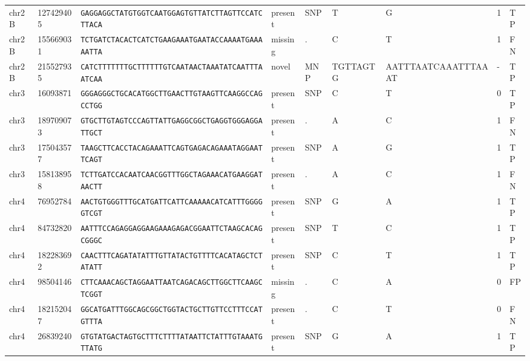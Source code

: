 \begin{landscape}
\begin{table}[]
\begin{tabular}{@{}lllllllll@{}}
chr2B & 127429405 & \texttt{GAGGAGGCTATGTGGTCAATGGAGTGTTATCTTAGTTCCATCTTACA} & present            & SNP       & T        & G                   & 1         & TP     \\
chr2B & 155669031 & \texttt{TCTGATCTACACTCATCTGAAGAAATGAATACCAAAATGAAAAATTA} & missing            & .         & C        & T                   & 1         & FN     \\
chr2B & 215527935 & \texttt{CATCTTTTTTTGCTTTTTTGTCAATAACTAAATATCAATTTAATCAA} & novel              & MNP       & TGTTAGTG & AATTTAATCAAATTTAAAT & -         & TP     \\
chr3  & 16093871  & \texttt{GGGAGGGCTGCACATGGCTTGAACTTGTAAGTTCAAGGCCAGCCTGG} & present            & SNP       & C        & T                   & 0         & TP     \\
chr3  & 189709073 & \texttt{GTGCTTGTAGTCCCAGTTATTGAGGCGGCTGAGGTGGGAGGATTGCT} & present            & .         & A        & C                   & 1         & FN     \\
chr3  & 175043577 & \texttt{TAAGCTTCACCTACAGAAATTCAGTGAGACAGAAATAGGAATTCAGT} & present            & SNP       & A        & G                   & 1         & TP     \\
chr3  & 158138958 & \texttt{TCTTGATCCACAATCAACGGTTTGGCTAGAAACATGAAGGATAACTT} & present            & .         & A        & C                   & 1         & FN     \\
chr4  & 76952784  & \texttt{AACTGTGGGTTTGCATGATTCATTCAAAAACATCATTTGGGGGTCGT} & present            & SNP       & G        & A                   & 1         & TP     \\
chr4  & 84732820  & \texttt{AATTTCCAGAGGAGGAAGAAAGAGACGGAATTCTAAGCACAGCGGGC} & present            & SNP       & T        & C                   & 1         & TP     \\
chr4  & 182283692 & \texttt{CAACTTTCAGATATATTTGTTATACTGTTTTCACATAGCTCTATATT} & present            & SNP       & C        & T                   & 1         & TP     \\
chr4  & 98504146  & \texttt{CTTCAAACAGCTAGGAATTAATCAGACAGCTTGGCTTCAAGCTCGGT} & missing            & .         & C        & A                   & 0         & FP     \\
chr4  & 182152047 & \texttt{GGCATGATTTGGCAGCGGCTGGTACTGCTTGTTCCTTTCCATGTTTA} & present            & .         & C        & T                   & 0         & FN     \\
chr4  & 26839240  & \texttt{GTGTATGACTAGTGCTTTCTTTTATAATTCTATTTGTAAATGTTATG} & present            & SNP       & G        & A                   & 1         & TP     \\

\end{tabular}
\end{table}
\end{landscape}

